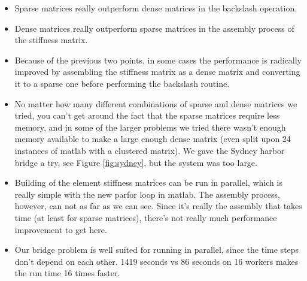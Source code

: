 \begin{itemize}
\item Sparse matrices really outperform dense matrices in the backslash operation.
\item Dense matrices really outperform sparse matrices in the assembly process of the stiffness matrix.
\item Because of the previous two points, in some cases the performance is radically improved by assembling the stiffness matrix as a dense matrix and converting it to a sparse one before performing the backslash routine.
\item No matter how many different combinations of sparse and dense matrices we tried, you can't get around the fact that the sparse matrices require less memory, and in some of the larger problems we tried there wasn't enough memory available to make a large enough dense matrix (even split upon 24 instances of matlab with a clustered matrix). We gave the Sydney harbor bridge a try, see Figure \ref{fig:sydney}, but the system was too large.
\item Building of the element stiffness matrices can be run in parallel, which is really simple with the new parfor loop in matlab. The assembly process, however, can not as far as we can see. Since it's really the assembly that takes time (at least for sparse matrices), there's not really much performance improvement to get here.
\item Our bridge problem is well suited for running in parallel, since the time steps don’t depend on each other. 1419 seconds vs 86 seconds on 16 workers makes the run time 16 times faster.
\end{itemize}
